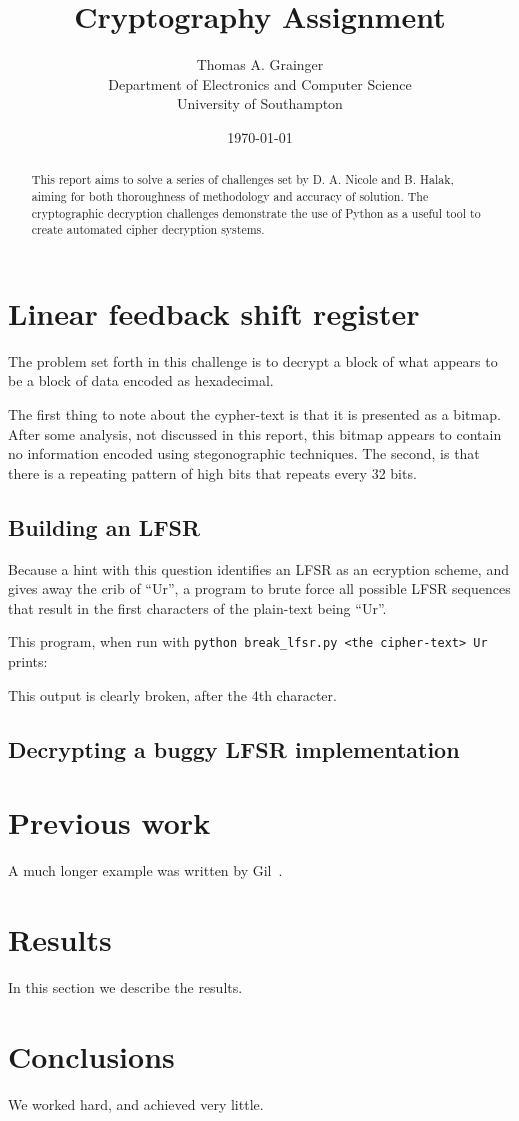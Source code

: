 \documentclass[pdftex, 12pt, a4paper]{article}
\title{Cryptography Assignment}
\author{
        Thomas A. Grainger \\
                Department of Electronics and Computer Science\\
        University of Southampton\\
}
\date{\today}
\begin{document}
\maketitle

\begin{abstract}
This report aims to solve a series of challenges set by D. A. Nicole and B. Halak\cite{instructions}, aiming for both thoroughness of methodology and accuracy of solution.  The cryptographic decryption challenges demonstrate the use of Python as a useful tool to create automated cipher decryption systems.
\end{abstract}

\tableofcontents

\section{Linear feedback shift register}

The problem set forth in this challenge is to decrypt a block of what appears to be a block of data encoded as hexadecimal.

The first thing to note about the cypher-text is that it is presented as a bitmap. After some analysis, not discussed in this report, this bitmap appears to contain no information encoded using stegonographic techniques.  The second, is that there is a repeating pattern of high bits that repeats every 32 bits.

\subsection{Building an LFSR}
Because a hint with this question identifies an LFSR as an ecryption scheme, and gives away the crib of ``Ur'', a program to brute force all possible LFSR sequences that result in the first characters of the plain-text being ``Ur''.



This program, when run with \verb`python break_lfsr.py <the cipher-text> Ur` prints:


This output is clearly broken, after the 4th character.

\subsection{Decrypting a buggy LFSR implementation}

\section{Previous work}\label{previous work}
A much longer \LaTeXe{} example was written by Gil~\cite{Gil:02}.

\section{Results}\label{results}
In this section we describe the results.

\section{Conclusions}\label{conclusions}
We worked hard, and achieved very little.



\end{document}
